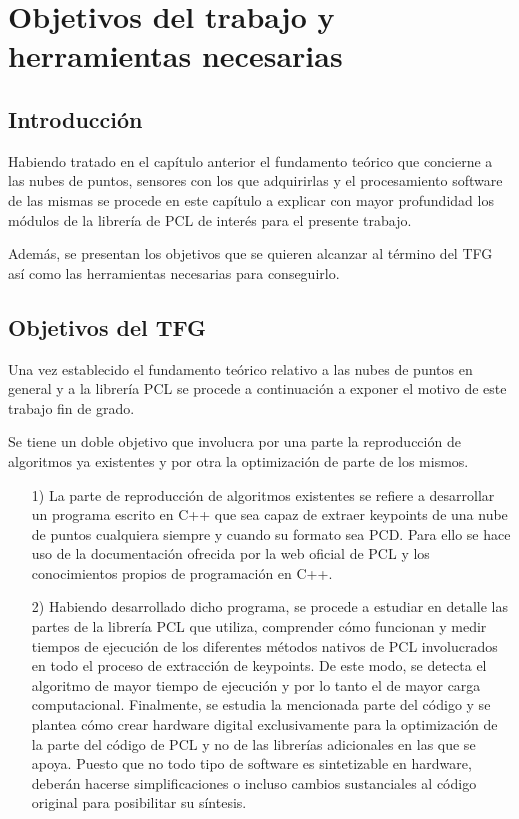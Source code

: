 \chapter{Objetivos del trabajo y herramientas necesarias}

\section{Introducción}
Habiendo tratado en el capítulo anterior el fundamento teórico que concierne a las nubes de puntos, sensores con los que adquirirlas y el procesamiento software de las mismas se procede en este capítulo a explicar con mayor profundidad los módulos de la librería de PCL de interés para el presente trabajo.

Además, se presentan los objetivos que se quieren alcanzar al término del TFG así como las herramientas necesarias para conseguirlo.




\section{Objetivos del TFG}
Una vez establecido el fundamento teórico relativo a las nubes de puntos en general y a la librería PCL se procede a continuación a exponer el motivo de este trabajo fin de grado.

Se tiene un doble objetivo que involucra por una parte la reproducción de algoritmos ya existentes y por otra la optimización de parte de los mismos.
\begin{itemize}
\item[1)] La parte de reproducción de algoritmos existentes se refiere a desarrollar un programa escrito en C++ que sea capaz de extraer keypoints de una nube de puntos cualquiera siempre y cuando su formato sea PCD. Para ello se hace uso de la documentación ofrecida por la web oficial de PCL y los conocimientos propios de programación en C++. 
\item[2)] Habiendo desarrollado dicho programa, se procede a estudiar en detalle las partes de la librería PCL que utiliza, comprender cómo funcionan y medir tiempos de ejecución de los diferentes métodos nativos de PCL involucrados en todo el proceso de extracción de keypoints. De este modo, se detecta el algoritmo de mayor tiempo de ejecución y por lo tanto el de mayor carga computacional. Finalmente, se estudia la mencionada parte del código y se plantea cómo crear hardware digital exclusivamente para la optimización de la parte del código de PCL y no de las librerías adicionales en las que se apoya. Puesto que no todo tipo de software es sintetizable en hardware, deberán hacerse simplificaciones o incluso cambios sustanciales al código original para posibilitar su síntesis.
\end{itemize}


